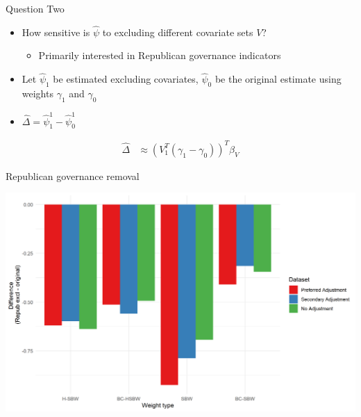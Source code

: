 \documentclass[hyperref={pdfpagelabels=false}]{beamer}
\begin{document}
\begin{frame}{Question Two}
    \begin{itemize}
        \item How sensitive is $\hat{\psi}$ to excluding different covariate sets $V$? \bigskip 
        \begin{itemize}
            \item Primarily interested in Republican governance indicators \bigskip
        \end{itemize}
        \item Let $\hat{\psi}_1$ be estimated excluding covariates, $\hat{\psi}_0$ be the original estimate using weights $\gamma_1$ and $\gamma_0$ \bigskip
        \item $\hat{\Delta} = \hat{\psi}^1_1 - \hat{\psi}^1_0$ \bigskip
    \end{itemize}
\begin{align*}
\hat{\Delta} &\approx (V_1^T(\gamma_1 - \gamma_0))^T\beta_V
\end{align*}

\end{frame}

\begin{frame}{Republican governance removal}
\begin{center}
	\includegraphics[scale=0.5]{01_Plots/repub-diff-c1-robustness.png}
\end{center}
\end{frame}
\end{document}
